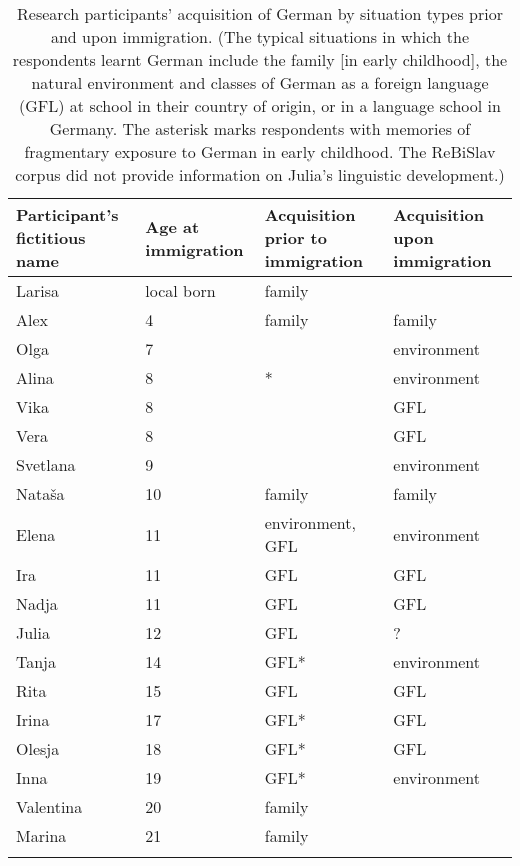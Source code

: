 \begin{table} 
\begin{small}
		\begin{tabular}{p{7em}<{\raggedright}p{7em}<{\raggedright}p{7.5em}<{\raggedright}p{7em}<{\raggedright}} 
		\lsptoprule
        Participant's fictitious name & Age at immigration & Acquisition prior to immigration & Acquisition upon immigration \\\midrule
		Larisa & local born & family & \\
		Alex & 4 & family & family\\
		Olga & 7 & & environment\\
		Alina & 8 & * & environment\\
		Vika & 8 & & GFL\\
		Vera & 8 & & GFL\\	
		Svetlana & 9 & & environment\\
		Nataša & 10 & family & family\\
		Elena & 11 & environment, GFL & environment\\
		Ira & 11 & GFL & GFL \\
		Nadja & 11 & GFL & GFL \\
		Julia & 12 & GFL & ?\\
		Tanja & 14 & GFL* & environment\\
		Rita & 15 & GFL & GFL\\
		Irina & 17 & GFL* & GFL\\
		Olesja & 18 & GFL* & GFL\\
		Inna & 19 & GFL* & environment\\
		Valentina & 20 & family & \\
		Marina & 21 & family & \\
		\lspbottomrule
	\end{tabular}
\end{small}
	\caption{Research participants' acquisition of German by situation types prior and upon immigration. (The typical situations in which the respondents learnt German include the family [in early childhood], the natural environment and classes of German as a foreign language (GFL) at school in their country of origin, or in a language school in Germany. The asterisk marks respondents with memories of fragmentary exposure to German in early childhood. The ReBiSlav corpus did not provide information on Julia's linguistic development.)\label{tab:3:4}}
\end{table}

